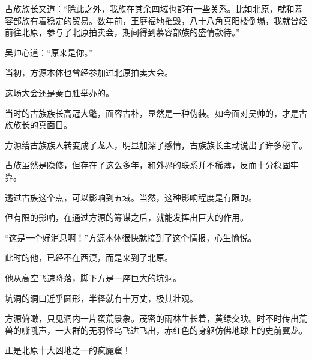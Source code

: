 \begin{this_body}
古族族长又道：“除此之外，我族在其余四域也都有一些关系。比如北原，就和慕容部族有着稳定的贸易。数年前，王庭福地摧毁，八十八角真阳楼倒塌，我就曾经前往北原，参与了北原拍卖会，期间得到慕容部族的盛情款待。”

吴帅心道：“原来是你。”

当初，方源本体也曾经参加过北原拍卖大会。

这场大会还是秦百胜举办的。

当时的古族族长高冠大氅，面容古朴，显然是一种伪装。如今面对吴帅的，才是古族族长的真面目。

方源给古族族人转变成了龙人，明显加深了感情，古族族长主动说出了许多秘辛。

古族虽然是隐修，但存在了这么多年，和外界的联系并不稀薄，反而十分稳固牢靠。

透过古族这个点，可以影响到五域。当然，这种影响程度是有限的。

但有限的影响，在通过方源的筹谋之后，就能发挥出巨大的作用。

“这是一个好消息啊！”方源本体很快就接到了这个情报，心生愉悦。

此时的他，已经不在西漠，而是来到了北原。

他从高空飞速降落，脚下方是一座巨大的坑洞。

坑洞的洞口近乎圆形，半径就有十万丈，极其壮观。

方源俯瞰，只见洞内一片蛮荒景象。茂密的雨林生长着，黄绿交映。时不时传出荒兽的嘶吼声，一大群的无羽怪鸟飞进飞出，赤红色的身躯仿佛地球上的史前翼龙。

正是北原十大凶地之一的疯魔窟！

\end{this_body}


